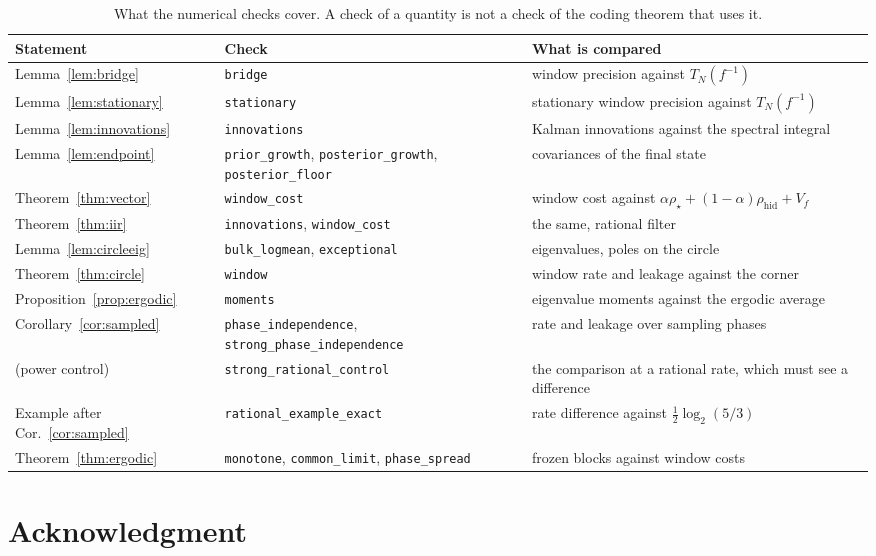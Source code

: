 \documentclass[11pt,onecolumn]{IEEEtran}
\newcommand{\rhid}{\rho_{\mathrm{hid}}}
\begin{document}
\begin{table}[!t]
\centering
\footnotesize
\caption{What the numerical checks cover. A check of a quantity is not a
check of the coding theorem that uses it.}
\label{tab:checks}
\begin{tabular}{lll}
\hline
Statement & Check & What is compared\\
\hline
Lemma~\ref{lem:bridge} & \texttt{bridge} & window precision against $T_N(f^{-1})$\\
Lemma~\ref{lem:stationary} & \texttt{stationary} & stationary window precision against $T_N(f^{-1})$\\
Lemma~\ref{lem:innovations} & \texttt{innovations} & Kalman innovations against the spectral integral\\
Lemma~\ref{lem:endpoint} & \texttt{prior\_growth}, \texttt{posterior\_growth}, \texttt{posterior\_floor} & covariances of the final state\\
Theorem~\ref{thm:vector} & \texttt{window\_cost} & window cost against $\alpha\rho_\star+(1-\alpha)\rhid+V_f$\\
Theorem~\ref{thm:iir} & \texttt{innovations}, \texttt{window\_cost} & the same, rational filter\\
Lemma~\ref{lem:circleeig} & \texttt{bulk\_logmean}, \texttt{exceptional} & eigenvalues, poles on the circle\\
Theorem~\ref{thm:circle} & \texttt{window} & window rate and leakage against the corner\\
Proposition~\ref{prop:ergodic} & \texttt{moments} & eigenvalue moments against the ergodic average\\
Corollary~\ref{cor:sampled} & \texttt{phase\_independence}, \texttt{strong\_phase\_independence} & rate and leakage over sampling phases\\
(power control) & \texttt{strong\_rational\_control} & the comparison at a rational rate, which must see a difference\\
Example after Cor.~\ref{cor:sampled} & \texttt{rational\_example\_exact} & rate difference against $\tfrac12\log_2(5/3)$\\
Theorem~\ref{thm:ergodic} & \texttt{monotone}, \texttt{common\_limit}, \texttt{phase\_spread} & frozen blocks against window costs\\
\hline
\end{tabular}
\end{table}

\section*{Acknowledgment}
\end{document}
